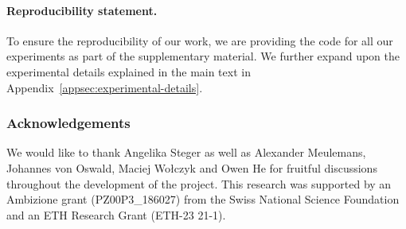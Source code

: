 \documentclass{article} \usepackage{iclr2025,times}
\begin{document}
\paragraph{Reproducibility statement.} To ensure the reproducibility of our work, we are providing the code for all our experiments as part of the supplementary material.
We further expand upon the experimental details explained in the main text in Appendix~\ref{appsec:experimental-details}.


\subsubsection*{Acknowledgements}
We would like to thank Angelika Steger as well as Alexander Meulemans, Johannes von Oswald, Maciej Wołczyk and Owen He for fruitful discussions throughout the development of the project.
This research was supported by an Ambizione grant (PZ00P3\_186027) from the Swiss National Science Foundation and an ETH Research Grant (ETH-23 21-1).
 

\clearpage{}\appendix
\renewcommand{\thefigure}{A\arabic{figure}}
\setcounter{figure}{0}
\renewcommand{\thetable}{A\arabic{table}}
\setcounter{table}{0}
\end{document}
